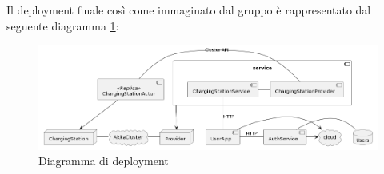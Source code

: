 Il deployment finale così come immaginato dal gruppo è rappresentato dal seguente diagramma \ref{fig:deployment}:

\begin{figure}[H]
    \centering
    \includegraphics[width=1\textwidth]{images/deployment.png}
    \caption{Diagramma di deployment}
    \label{fig:deployment}
\end{figure}







\newpage
